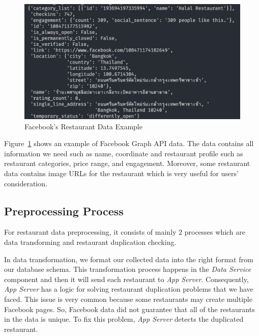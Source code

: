\documentclass[12pt,oneside,openright,a4paper]{cpe-english-project}
\begin{document}
\newpage
\begin{figure}[H]\centering
\includegraphics[width=400pt]{./images/4FacebooksRestaurantDataExample.png}
\caption{Facebook’s Restaurant Data Example}\label{fig:4FacebooksRestaurantDataExample}
\end{figure}\vspace{-24pt}

Figure~\ref{fig:4FacebooksRestaurantDataExample} shows an example of Facebook Graph API data. The data contains all information we need such as name, coordinate and restaurant profile such as restaurant categories, price range, and engagement. Moreover, some restaurant data contains image URLs for the restaurant which is very useful for users’ consideration.

\subsection{Preprocessing Process}

For restaurant data preprocessing, it consists of mainly 2 processes which are data transforming and restaurant duplication checking.

In data transformation, we format our collected data into the right format from our database schema. This transformation process happens in the \textit{Data Service} component and then it will send each restaurant to \textit{App Server}. Consequently, \textit{App Server} has a logic for solving restaurant duplication problems that we have faced. This issue is very common because some restaurants may create multiple Facebook pages. So, Facebook data did not guarantee that all of the restaurants in the data is unique. To fix this problem, \textit{App Server} detects the duplicated restaurant.
\end{document}
